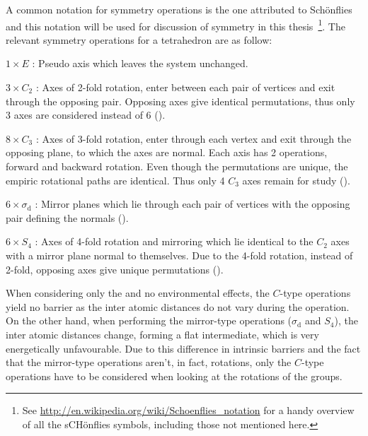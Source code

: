 A common notation for symmetry operations is the one attributed to Sch\"onflies~\cite{schonflies-notation-1889} and this notation will be used for discussion of symmetry in this thesis~\footnote{See \url{http://en.wikipedia.org/wiki/Schoenflies_notation} for a handy overview of all the sCH\"onflies symbols, including those not mentioned here.}.
The relevant symmetry operations for a tetrahedron are as follow:
\bit
\item $1 \times E$ : Pseudo axis which leaves the system unchanged.
\item $3 \times C_2$ : Axes of 2-fold rotation, enter between each pair of vertices and exit through the opposing pair.
Opposing axes give identical permutations, thus only 3 axes are considered instead of 6 ().
\item $8 \times C_3$ : Axes of 3-fold rotation, enter through each vertex and exit through the opposing plane, to which the axes are normal. Each axis has 2 operations, forward and backward rotation.
Even though the permutations are unique, the empiric rotational paths are identical.
Thus only 4 $C_3$ axes remain for study ().
\item $6 \times \sigma_\text{d}$ : Mirror planes which lie through each pair of vertices with the opposing pair defining the normals ().
\item $6 \times S_4$ : Axes of 4-fold rotation and mirroring which lie identical to the $C_2$ axes with a mirror plane normal to themselves. Due to the 4-fold rotation, instead of 2-fold, opposing axes give unique permutations ().
\eit

When considering only the  and no environmental effects, the $C$-type operations yield no barrier as the inter atomic distances do not vary during the operation.
On the other hand, when performing the mirror-type operations ($\sigma_\text{d}$ and $S_4$), the inter atomic distances change, forming a flat  intermediate, which is very energetically unfavourable.
Due to this difference in intrinsic barriers and the fact that the mirror-type operations aren't, in fact, rotations, only the $C$-type operations have to be considered when looking at the rotations of the  groups.

